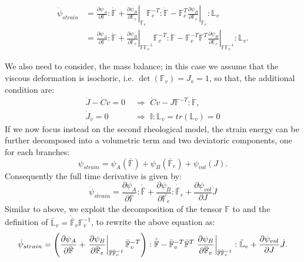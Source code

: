 \documentclass[12pt]{extarticle}
\newcommand{\F}{\ensuremath{\mathbb{F}}}
\newcommand{\LL}{\ensuremath{\mathbb{L}}}
\begin{document}
\begin{equation}
\begin{aligned}
\dot{\psi}_{strain} &= \frac{\partial \psi_A}{\partial \F}:\dot{\F} +  \left.\frac{\partial \psi_B}{\partial \F_e}\right|_{\F_e}\F_v^{-T}:\dot{\F}-\F_e^T\left.\frac{\partial \psi_B}{\partial \F_e}\right|_{\F_e}:\LL_v \\
&=  \frac{\partial \psi_A}{\partial \F}:\dot{\F} +  \left.\frac{\partial \psi_B}{\partial \F_e}\right|_{\F\F_v^{-1}}\F_v^{-T}:\dot{\F}-\F_v^{-T}\F^T\left.\frac{\partial \psi_B}{\partial \F_e}\right|_{\F\F_v^{-1}}:\LL_v.
\end{aligned}
\end{equation}

We also need to consider, the mass balance; in this case we assume that the viscous deformation is isochoric, i.e. $\det(\F_v)=J_v=1$, so that, the additional condition are:
\begin{equation}
 \begin{aligned}
 \dot{J} - \dot{C}v=0&\,\,\Longrightarrow\,\,\dot{C}v-J\F^{-T}:\dot{\F},\\
 \dot{J}_v=0 &\,\,\Longrightarrow \,\,\mathbb{I}:\LL_v=tr(\LL_v)=0
 \end{aligned}
\end{equation}
If we now focus instead on the second rheological model, the strain energy can be further decomposed into a volumetric term and two deviatoric components, one for each branches:
\begin{equation}
\psi_{strain}=\psi_{A}(\bar{\F})+\psi_{B}(\bar{\F}_e)+ \psi_{vol}(J).
\end{equation}
Consequently the full time derivative is given by:
\begin{equation}
\dot{\psi}_{strain}= \frac{\partial \psi_A}{\partial \bar{\F}}:\dot{\bar{\F}} +  \frac{\partial \psi_B}{\partial \bar{\F_e}}:\dot{\bar{\F}}_e + \frac{\partial \psi_{vol}}{\partial J} \dot{J}
\end{equation}
Similar to above, we exploit the decomposition of the tensor $\F$ to and the definition of $\bar{\LL}_v= \dot{\bar{\F}}_v\F_v^{-1}$, to rewrite the above equation as:
\begin{equation}
\scriptsize
\dot{\psi}_{strain}=\left(\frac{\partial \psi_A}{\partial \bar{\F}}+  \left.\frac{\partial \psi_B}{\partial \bar{\F}_e}\right|_{\bar{\F}\bar{\F}_v^{-1}}\bar{\F}_v^{-T}\right):\dot{\bar{\F}}-\bar{\F}_v^{-T}\bar{\F}^T\left.\frac{\partial \psi_B}{\partial \bar{\F}_e}\right|_{\bar{\F}\bar{\F}_v^{-1}}:\bar{\LL}_v + \frac{\partial \psi_{vol}}{\partial J} \dot{J}. \label{eq4}
\end{equation}
\end{document}
